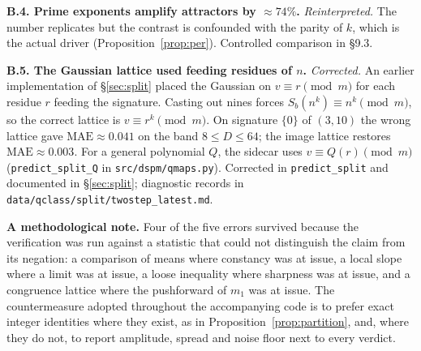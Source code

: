 \documentclass[11pt]{article}
\theoremstyle{definition}
\theoremstyle{remark}
\begin{document}
\medskip
\noindent\textbf{B.4. Prime exponents amplify attractors by $\approx 74\%$.} \emph{Reinterpreted.} The number replicates but the contrast is confounded with the parity of $k$, which is the actual driver (Proposition~\ref{prop:per}). Controlled comparison in \S9.3.

\medskip
\noindent\textbf{B.5. The Gaussian lattice used feeding residues of $n$.} \emph{Corrected.} An earlier implementation of \S\ref{sec:split} placed the Gaussian on $v \equiv r \pmod m$ for each residue $r$ feeding the signature. Casting out nines forces $S_b(n^k) \equiv n^k \pmod m$, so the correct lattice is $v \equiv r^k \pmod m$. On signature $\{0\}$ of $(3,10)$ the wrong lattice gave $\mathrm{MAE} \approx 0.041$ on the band $8 \le D \le 64$; the image lattice restores $\mathrm{MAE} \approx 0.003$. For a general polynomial $Q$, the sidecar uses $v \equiv Q(r) \pmod m$ (\texttt{predict\_split\_Q} in \texttt{src/dspm/qmaps.py}). Corrected in \texttt{predict\_split} and documented in \S\ref{sec:split}; diagnostic records in \texttt{data/qclass/split/twostep\_latest.md}.

\medskip
\noindent\textbf{A methodological note.} Four of the five errors survived because the verification was run against a statistic that could not distinguish the claim from its negation: a comparison of means where constancy was at issue, a local slope where a limit was at issue, a loose inequality where sharpness was at issue, and a congruence lattice where the pushforward of $m_1$ was at issue. The countermeasure adopted throughout the accompanying code is to prefer exact integer identities where they exist, as in Proposition~\ref{prop:partition}, and, where they do not, to report amplitude, spread and noise floor next to every verdict.
\end{document}
